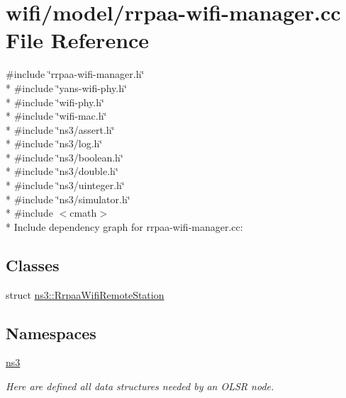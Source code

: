 \hypertarget{rrpaa-wifi-manager_8cc}{}\section{wifi/model/rrpaa-\/wifi-\/manager.cc File Reference}
\label{rrpaa-wifi-manager_8cc}
{\ttfamily \#include \char`\"{}rrpaa-\/wifi-\/manager.\+h\char`\"{}}\\*
{\ttfamily \#include \char`\"{}yans-\/wifi-\/phy.\+h\char`\"{}}\\*
{\ttfamily \#include \char`\"{}wifi-\/phy.\+h\char`\"{}}\\*
{\ttfamily \#include \char`\"{}wifi-\/mac.\+h\char`\"{}}\\*
{\ttfamily \#include \char`\"{}ns3/assert.\+h\char`\"{}}\\*
{\ttfamily \#include \char`\"{}ns3/log.\+h\char`\"{}}\\*
{\ttfamily \#include \char`\"{}ns3/boolean.\+h\char`\"{}}\\*
{\ttfamily \#include \char`\"{}ns3/double.\+h\char`\"{}}\\*
{\ttfamily \#include \char`\"{}ns3/uinteger.\+h\char`\"{}}\\*
{\ttfamily \#include \char`\"{}ns3/simulator.\+h\char`\"{}}\\*
{\ttfamily \#include $<$cmath$>$}\\*
Include dependency graph for rrpaa-\/wifi-\/manager.cc\+:
\subsection*{Classes}
\begin{DoxyCompactItemize}
\item 
struct \hyperlink{structns3_1_1RrpaaWifiRemoteStation}{ns3\+::\+Rrpaa\+Wifi\+Remote\+Station}
\end{DoxyCompactItemize}
\subsection*{Namespaces}
\begin{DoxyCompactItemize}
\item 
 \hyperlink{namespacens3}{ns3}
\begin{DoxyCompactList}\small\item\em Here are defined all data structures needed by an O\+L\+SR node. \end{DoxyCompactList}\end{DoxyCompactItemize}
